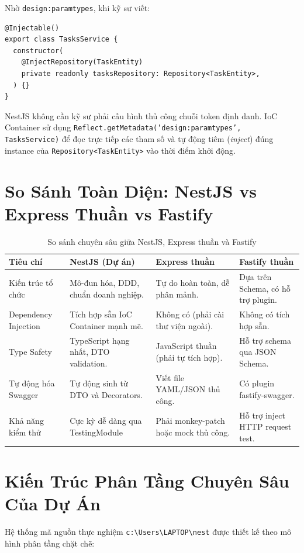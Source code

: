 \documentclass[12pt,a4paper,oneside]{book}
\begin{document}
Nhờ \texttt{design:paramtypes}, khi kỹ sư viết:
\begin{codebox}
\begin{Verbatim}[fontsize=\small]
@Injectable()
export class TasksService {
  constructor(
    @InjectRepository(TaskEntity)
    private readonly tasksRepository: Repository<TaskEntity>,
  ) {}
}
\end{Verbatim}
\end{codebox}
NestJS không cần kỹ sư phải cấu hình thủ công chuỗi token định danh. IoC Container sử dụng \texttt{Reflect.getMetadata('design:paramtypes', TasksService)} để đọc trực tiếp các tham số và tự động tiêm (\textit{inject}) đúng instance của \texttt{Repository<TaskEntity>} vào thời điểm khởi động.

\section{So Sánh Toàn Diện: NestJS vs Express Thuần vs Fastify}

\begin{table}[htbp]
  \centering
  \small
  \caption{So sánh chuyên sâu giữa NestJS, Express thuần và Fastify}
  \label{tab:framework-comparison}
  \begin{tabularx}{\textwidth}{l p{3.2cm} p{3.2cm} X}
    \toprule
    \textbf{Tiêu chí} & \textbf{NestJS (Dự án)} & \textbf{Express thuần} & \textbf{Fastify thuần} \\
    \midrule
    Kiến trúc tổ chức & Mô-đun hóa, DDD, chuẩn doanh nghiệp. & Tự do hoàn toàn, dễ phân mảnh. & Dựa trên Schema, có hỗ trợ plugin. \\
    Dependency Injection & Tích hợp sẵn IoC Container mạnh mẽ. & Không có (phải cài thư viện ngoài). & Không có tích hợp sẵn. \\
    Type Safety & TypeScript hạng nhất, DTO validation. & JavaScript thuần (phải tự tích hợp). & Hỗ trợ schema qua JSON Schema. \\
    Tự động hóa Swagger & Tự động sinh từ DTO và Decorators. & Viết file YAML/JSON thủ công. & Có plugin fastify-swagger. \\
    Khả năng kiểm thử & Cực kỳ dễ dàng qua TestingModule & Phải monkey-patch hoặc mock thủ công. & Hỗ trợ inject HTTP request test. \\
    \bottomrule
  \end{tabularx}
\end{table}

\section{Kiến Trúc Phân Tầng Chuyên Sâu Của Dự Án}
Hệ thống mã nguồn thực nghiệm \texttt{c:\textbackslash Users\textbackslash LAPTOP\textbackslash nest} được thiết kế theo mô hình phân tầng chặt chẽ:
\end{document}
